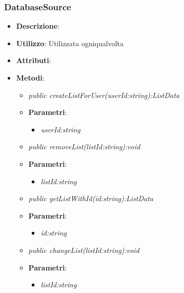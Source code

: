 \subsubsection{DatabaseSource}
\begin{itemize}
\item \textbf{Descrizione}: 
\item \textbf{Utilizzo}: Utilizzata ogniqualvolta
\item \textbf{Attributi}: 
\item \textbf{Metodi}:
	\begin{itemize}
	\item \textit{public createListForUser(userId:string):ListData}\\

			\item{\textbf{Parametri}: \begin{itemize}
			\item \textit{userId:string}\\

			\end{itemize}}
	\item \textit{public removeList(listId:string):void}\\

			\item{\textbf{Parametri}: \begin{itemize}
			\item \textit{listId:string}\\

			\end{itemize}}
	\item \textit{public getListWithId(id:string):ListData}\\

			\item{\textbf{Parametri}: \begin{itemize}
			\item \textit{id:string}\\

			\end{itemize}}
	\item \textit{public changeList(listId:string):void}\\

			\item{\textbf{Parametri}: \begin{itemize}
			\item \textit{listId:string}\\


\end{itemize}}
\end{itemize}
\end{itemize}
